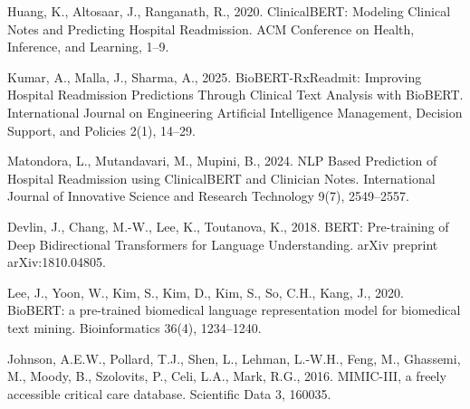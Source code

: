 \documentclass[3p,times,procedia]{elsarticle}
\begin{document}
\begin{thebibliography}{6}

 Huang, K., Altosaar, J., Ranganath, R., 2020. ClinicalBERT: Modeling Clinical Notes and Predicting Hospital Readmission. ACM Conference on Health, Inference, and Learning, 1--9.

 Kumar, A., Malla, J., Sharma, A., 2025. BioBERT-RxReadmit: Improving Hospital Readmission Predictions Through Clinical Text Analysis with BioBERT. International Journal on Engineering Artificial Intelligence Management, Decision Support, and Policies 2(1), 14--29.

 Matondora, L., Mutandavari, M., Mupini, B., 2024. NLP Based Prediction of Hospital Readmission using ClinicalBERT and Clinician Notes. International Journal of Innovative Science and Research Technology 9(7), 2549--2557.

 Devlin, J., Chang, M.-W., Lee, K., Toutanova, K., 2018. BERT: Pre-training of Deep Bidirectional Transformers for Language Understanding. arXiv preprint arXiv:1810.04805.

 Lee, J., Yoon, W., Kim, S., Kim, D., Kim, S., So, C.H., Kang, J., 2020. BioBERT: a pre-trained biomedical language representation model for biomedical text mining. Bioinformatics 36(4), 1234--1240.

 Johnson, A.E.W., Pollard, T.J., Shen, L., Lehman, L.-W.H., Feng, M., Ghassemi, M., Moody, B., Szolovits, P., Celi, L.A., Mark, R.G., 2016. MIMIC-III, a freely accessible critical care database. Scientific Data 3, 160035.

\end{thebibliography}
\end{document}
